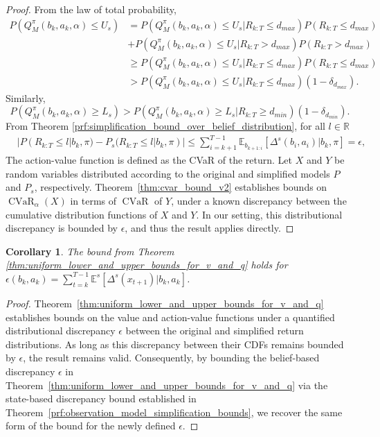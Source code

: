 \documentclass[acmlarge, manuscript, screen, review, natbib=false, oneside]{acmart}
\newtheorem{corollary}[theorem]{Corollary}
\DeclareMathOperator{\CVaR}{CVaR}
\begin{document}
\begin{proof}
	From the law of total probability,
	\begin{equation}
		\begin{aligned}
			P(Q_M^\pi(b_k, a_k,\alpha)\leq U_s) 
			&= P(Q_M^\pi(b_k, a_k,\alpha) \leq U_s| R_{k:T}\leq d_{max})P(R_{k:T}\leq d_{max}) \\
			&+P(Q_M^\pi(b_k, a_k,\alpha) \leq U_s| R_{k:T} > d_{max})P(R_{k:T} > d_{max})\\
			&\geq P(Q_M^\pi(b_k, a_k,\alpha) \leq U_s| R_{k:T}\leq d_{max})P(R_{k:T}\leq d_{max}) \\
			&>P(Q_M^\pi(b_k, a_k,\alpha) \leq U_s| R_{k:T}\leq d_{max})(1-\delta_{d_{max}}).
		\end{aligned}
	\end{equation}
	Similarly, 
	\begin{equation}
		P(Q_M^\pi(b_k, a_k,\alpha) \geq L_s) > P(Q_M^\pi(b_k, a_k,\alpha) \geq L_s | R_{k:T}\geq d_{min})(1-\delta_{d_{min}}).
	\end{equation}
	From Theorem \ref{prf:simplification_bound_over_belief_distribution}, for all $l\in \mathbb{R}$
	\begin{equation}
		\begin{aligned}
			&|P(R_{k:T} \leq l|b_k,\pi)-P_s(R_{k:T} \leq l|b_k,\pi)| 
			\leq \sum_{i=k+1}^{T-1} \mathbb{E}_{b_{{k+1}:i}}
			[\Delta^s(b_i, a_i)|b_k,\pi]=\epsilon,
		\end{aligned}
	\end{equation}
	The action-value function is defined as the CVaR of the return. Let $X$ and $Y$ be random variables distributed according to the original and simplified models $P$ and $P_s$, respectively. Theorem~\ref{thm:cvar_bound_v2} establishes bounds on $\CVaR_\alpha(X)$ in terms of $\CVaR$ of $Y$, under a known discrepancy between the cumulative distribution functions of $X$ and $Y$. In our setting, this distributional discrepancy is bounded by $\epsilon$, and thus the result applies directly.
\end{proof}

\begin{corollary}\label{prf:cvar_tv_dist_bound_simp_obs}
	The bound from Theorem \ref{thm:uniform_lower_and_upper_bounds_for_v_and_q} holds for $\epsilon(b_k, a_k)=\sum_{t=k}^{T-1} \mathbb{E}^s[\Delta^s(x_{t+1})|b_k, a_k]$.
\end{corollary}
\begin{proof}
	Theorem~\ref{thm:uniform_lower_and_upper_bounds_for_v_and_q} establishes bounds on the value and action-value functions under a quantified distributional discrepancy $\epsilon$ between the original and simplified return distributions. As long as this discrepancy between their CDFs remains bounded by $\epsilon$, the result remains valid. Consequently, by bounding the belief-based discrepancy $\epsilon$ in Theorem~\ref{thm:uniform_lower_and_upper_bounds_for_v_and_q} via the state-based discrepancy bound established in Theorem~\ref{prf:observation_model_simplification_bounds}, we recover the same form of the bound for the newly defined $\epsilon$.
\end{proof}
\end{document}
